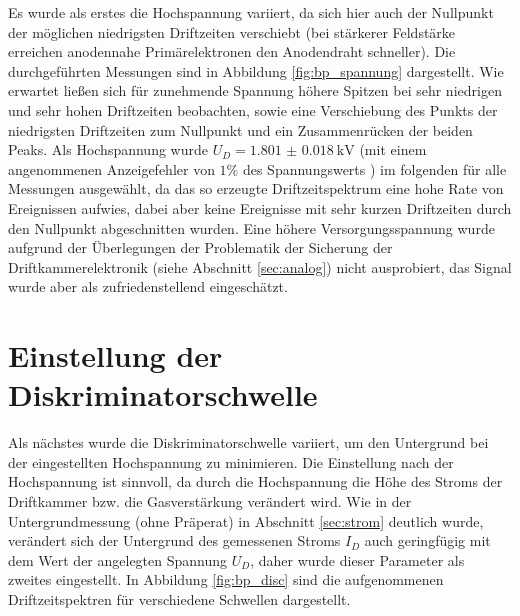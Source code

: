 Es wurde als erstes die Hochspannung variiert, da sich hier auch der Nullpunkt der möglichen niedrigsten Driftzeiten verschiebt \cite[34]{hammanndiplom} (bei stärkerer Feldstärke erreichen anodennahe Primärelektronen den Anodendraht schneller). Die durchgeführten Messungen sind in Abbildung \ref{fig:bp_spannung} dargestellt. Wie erwartet ließen sich für zunehmende Spannung höhere Spitzen bei sehr niedrigen und sehr hohen Driftzeiten beobachten, sowie eine Verschiebung des Punkts der niedrigsten Driftzeiten zum Nullpunkt und ein Zusammenrücken der beiden Peaks. Als Hochspannung wurde $U_D=\SI{1.801(18)}{\kilo\V}$ (mit einem angenommenen Anzeigefehler von $1\%$ des Spannungswerts \cite[2]{515versuchsanleitung}) im folgenden für alle Messungen ausgewählt, da das so erzeugte Driftzeitspektrum eine hohe Rate von Ereignissen aufwies, dabei aber keine Ereignisse mit sehr kurzen Driftzeiten durch den Nullpunkt abgeschnitten wurden. Eine höhere Versorgungsspannung wurde aufgrund der Überlegungen der Problematik der Sicherung der Driftkammerelektronik (siehe Abschnitt \ref{sec:analog}) nicht ausprobiert, das Signal wurde aber als zufriedenstellend eingeschätzt.

\section{Einstellung der Diskriminatorschwelle} \label{sec:disc_bp}

Als nächstes wurde die Diskriminatorschwelle variiert, um den Untergrund bei der eingestellten Hochspannung zu minimieren. Die Einstellung nach der Hochspannung ist sinnvoll, da durch die Hochspannung die Höhe des Stroms der Driftkammer bzw. die Gasverstärkung verändert wird. Wie in der Untergrundmessung (ohne Präperat) in Abschnitt \ref{sec:strom} deutlich wurde, verändert sich der Untergrund des gemessenen Stroms $I_D$ auch geringfügig mit dem Wert der angelegten Spannung $U_D$, daher wurde dieser Parameter als zweites eingestellt. In Abbildung \ref{fig:bp_disc} sind die aufgenommenen Driftzeitspektren für verschiedene Schwellen dargestellt.


